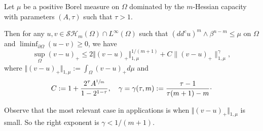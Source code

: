 \begin{proposition} \label{prop:stability} Let $\mu$ be a positive Borel measure on $\Omega$ dominated by the $m$\nobreakdash-Hessian capacity with parameters $(A, \tau)$ such that $\tau > 1$.

Then for any $u, v \in \mathcal {SH}_m (\Omega) \cap L^{\infty} (\Omega)$ such that $(dd^c u)^m \wedge \beta^{n - m} \leq \mu$ on $\Omega$ and $\liminf_{\partial \Omega} (u - v) \geq 0$, we have
\begin{equation} \label{eq:stability}
\sup_{\Omega} (v - u)_+ \leq 2 \Vert (v-u)_+\Vert_{1,\mu}^{1 \slash (m+1)} + C \|(v-u)_+\|^\gamma_{1,\mu},
\end{equation}
where $\Vert (v-u)_+ \Vert_{1,\mu}:= \int_{\Omega} (v-u)_+ d \mu$ and
\begin{equation} \label{eq:stbilityconstant}
C:= 1 + \frac{2^{\tau} A^{\sfrac{1}{m}}}{1-2^{1 -\tau}}, \quad \gamma = \gamma (\tau,m):= \frac{\tau - 1}{\tau (m + 1) - m }\cdot
\end{equation}
\end{proposition}
Observe that the most relevant case in applications is when $\Vert (v-u)_+ \Vert_{1,\mu}$ is small. So the right exponent is $\gamma < 1 \slash (m +1)$.
